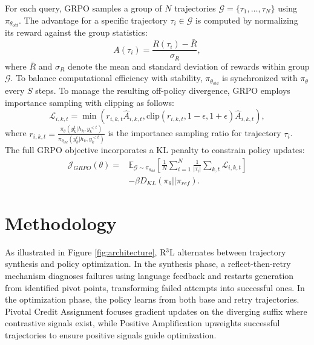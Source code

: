 \documentclass[11pt]{article}
\theoremstyle{definition}
\theoremstyle{remark}
\begin{document}
For each query, GRPO samples a group of $N$ trajectories $\mathcal{G} = \{\tau_1, \ldots, \tau_N\}$ using $\pi_{\theta_{old}}$. The advantage for a specific trajectory $\tau_i \in \mathcal{G}$ is computed by normalizing its reward against the group statistics:
\begin{equation}
    A(\tau_i) = \frac{R(\tau_i) - \bar{R}}{\sigma_R},
    \label{eq:grpo_advantage}
\end{equation}
where $\bar{R}$ and $\sigma_R$ denote the mean and standard deviation of rewards within group $\mathcal{G}$.
To balance computational efficiency with stability, $\pi_{\theta_{old}}$ is synchronized with $\pi_{\theta}$ every $S$ steps. To manage the resulting off-policy divergence, GRPO employs importance sampling with clipping as follows:
\begin{equation}
    \mathcal{L}_{i,k,t}\!\! =\!\! \min\! \! \left( \! r_{i,k,t} \hat{A}_{i,k,t},\! \text{clip}(r_{i,k,t}, \! 1 \!\!- \!\epsilon, \! 1 \!+\!\epsilon) \hat{A}_{i,k,t} \! \right)\!,
\end{equation}
where $r_{i,k,t} = \frac{\pi_{\theta}(y_k^t | h_k, y_k^{<t})}{\pi_{\theta_{old}}(y_k^t | h_k, y_k^{<t})}$ is the importance sampling ratio for trajectory $\tau_i$. The full GRPO objective incorporates a KL penalty to constrain policy updates:
\begin{equation}
\begin{split}
    \mathcal{J}_{GRPO}(\theta) = &\mathbb{E}_{\mathcal{G} \sim \pi_{\theta_{old}}} \left[ \frac{1}{N} \sum_{i=1}^N \frac{1}{|\tau_i|} \sum_{k,t} \mathcal{L}_{i,k,t} \right] \\
    &- \beta D_{KL}(\pi_{\theta} || \pi_{ref}).
\end{split}
\label{eq:grpo_full}
\end{equation}

\section{Methodology}

As illustrated in Figure \ref{fig:architecture}, R$^3$L alternates between trajectory synthesis and policy optimization. In the synthesis phase, a reflect-then-retry mechanism diagnoses failures using language feedback and restarts generation from identified pivot points, transforming failed attempts into successful ones. In the optimization phase, the policy learns from both base and retry trajectories. Pivotal Credit Assignment focuses gradient updates on the diverging suffix where contrastive signals exist, while Positive Amplification upweights successful trajectories to ensure positive signals guide optimization.
\end{document}
